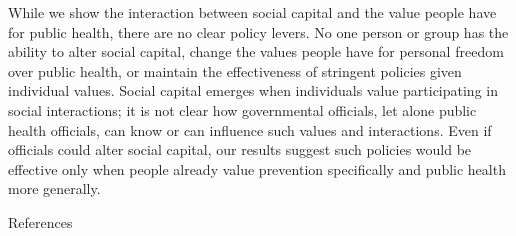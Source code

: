 \documentclass[
]{article}
\begin{document}
While we show the interaction between social capital and the value
people have for public health, there are no clear policy levers. No one
person or group has the ability to alter social capital, change the
values people have for personal freedom over public health, or maintain
the effectiveness of stringent policies given individual values. Social
capital emerges when individuals value participating in social
interactions; it is not clear how governmental officials, let alone
public health officials, can know or can influence such values and
interactions. Even if officials could alter social capital, our results
suggest such policies would be effective only when people already value
prevention specifically and public health more generally.

\newpage

References
\end{document}
